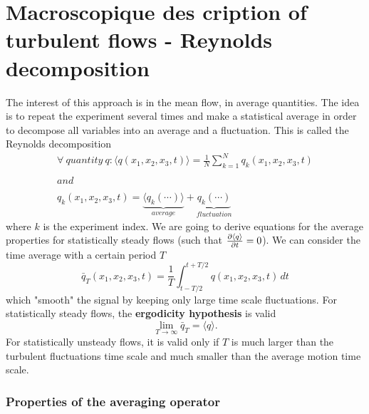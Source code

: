 \section{Macroscopique des cription of turbulent flows - Reynolds decomposition}
	The interest of this approach is in the mean flow, in average quantities. The idea is to repeat the experiment several times and make a statistical average in order to decompose all variables into an average and a fluctuation. This is called the Reynolds decomposition
	\begin{equation}
	\begin{array}{c}
		\forall \ quantity \ q : \langle q(x_1,x_2,x_3,t)\rangle =  \frac{1}{N} \sum _{k=1}^N q_k(x_1,x_2,x_3,t)\\ \\
		and \\ \\
		q_k(x_1,x_2,x_3,t) = \underbrace{\langle q_k(\cdots )\rangle}_{average} + \underbrace{q_k(\cdots )}_{fluctuation}
	\end{array}
	\end{equation}
	where $k$ is the experiment index. We are going to derive equations for the average properties for statistically steady flows (such that $\frac{\partial \langle q\rangle}{\partial t} = 0$). We can consider the time average with a certain period $T$
	\begin{equation}
		\bar{q}_T (x_1,x_2,x_3,t) = \frac{1}{T} \int _{t-T/2}^{t+T/2} q(x_1,x_2,x_3,t) \, dt
	\end{equation}
	which "smooth" the signal by keeping only large time scale fluctuations. For statistically steady flows, the \textbf{ergodicity hypothesis} is valid 
	\begin{equation}
		\lim _{T\rightarrow \infty} \bar{q}_T =  \langle q \rangle .
	\end{equation}
	For statistically unsteady flows, it is valid only if $T$ is much larger than the turbulent fluctuations time scale and much smaller than the average motion time scale. 
	
	\subsubsection{Properties of the averaging operator}

